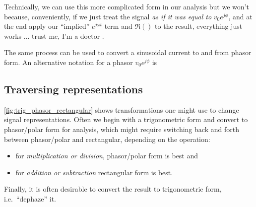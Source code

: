 \documentclass[electronics.tex]{subfiles}
\begin{document}
Technically, we can use this more complicated form in our analysis but we won't because, conveniently, if we just treat the signal \emph{as if it was equal to} $v_0 e^{j\phi}$, and at the end apply our ``implied'' $e^{j\omega t}$ term and $\Re()$ to the result, everything just works ... trust me, I'm a doctor \Winkey.
\tags{}

\begin{center}
{\sffamily
{}
}
\end{center}

The same process can be used to convert a sinusoidal current to and from phasor form.
An alternative notation for a phasor $v_0 e^{j\phi}$ is
\tags{}

\subsection{Traversing representations}
\tags{}

\cref{fig:trig_phasor_rectangular} shows transformations one might use to change signal representations.
Often we begin with a trigonometric form and convert to phasor/polar form for analysis, which might require switching back and forth between phasor/polar and rectangular, depending on the operation:
\tags{}
\begin{itemize}
  \item for \emph{multiplication or division}, phasor/polar form is best and
  \item for \emph{addition or subtraction} rectangular form is best.
\end{itemize}

Finally, it is often desirable to convert the result to trigonometric form, i.e.\ ``dephaze'' it.
\tags{}
\end{document}
